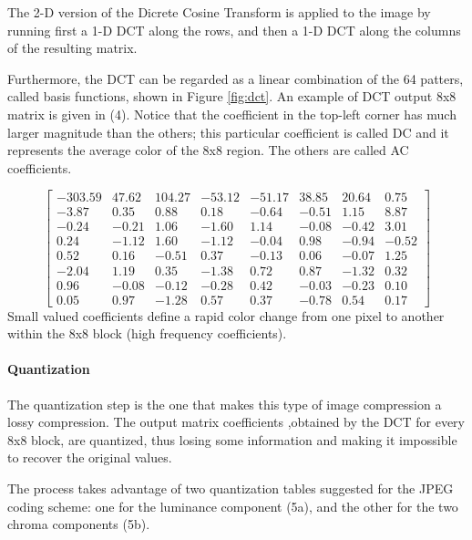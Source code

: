 \documentclass[14pt,a4paper]{extarticle}
\begin{document}
The 2-D version of the Dicrete Cosine Transform is applied to the image by running first a 1-D DCT along the rows, and then a 1-D DCT along the columns of the resulting matrix. 

Furthermore, the DCT can be regarded as a linear combination of the 64 patters, called basis functions, shown in Figure \ref{fig:dct}. An example of DCT output 8x8 matrix is given in (4). Notice that the coefficient in the top-left corner has much larger magnitude than the others; this particular coefficient is called DC and it represents the average color of the 8x8 region. The others are called AC coefficients.

\begin{equation}
\begin{bmatrix}
-303.59 & 47.62 & 104.27 & -53.12 &	-51.17 & 38.85 &	20.64 &	0.75 \\
-3.87 &	0.35 &	0.88 &	0.18 & -0.64 & 	-0.51 &	1.15 & 	8.87 \\
-0.24 &	-0.21 &	1.06 &	-1.60 &	1.14 & 	-0.08 &	-0.42 &	3.01 \\
0.24 &	-1.12 &	1.60 &	-1.12 &	-0.04 &	0.98 & 	-0.94 & 	-0.52 \\
0.52 &	0.16 &	-0.51 &	0.37 &	-0.13 &	0.06 &	-0.07 & 	1.25 \\
-2.04 &	1.19 &	0.35 &	-1.38 &	0.72 &	0.87 &	-1.32 &	0.32 \\
0.96 &	-0.08 &	-0.12 &	-0.28 &	0.42 &	-0.03 &	-0.23 &	0.10 \\
0.05 &	0.97 &	-1.28 &	0.57 & 0.37 &	-0.78 &	0.54 &	0.17
\end{bmatrix}
\end{equation}
Small valued coefficients define a rapid color change from one pixel to another within the 8x8 block (high frequency coefficients).

\paragraph{Quantization} The quantization step is the one that makes this type of image compression a lossy compression. The output matrix coefficients ,obtained by the DCT for every 8x8 block, are quantized, thus losing some information and making it impossible to recover the original values. 

The process takes advantage of two quantization tables suggested for the JPEG coding scheme: one for the luminance component (5a), and the other for the two chroma components (5b).
\end{document}

